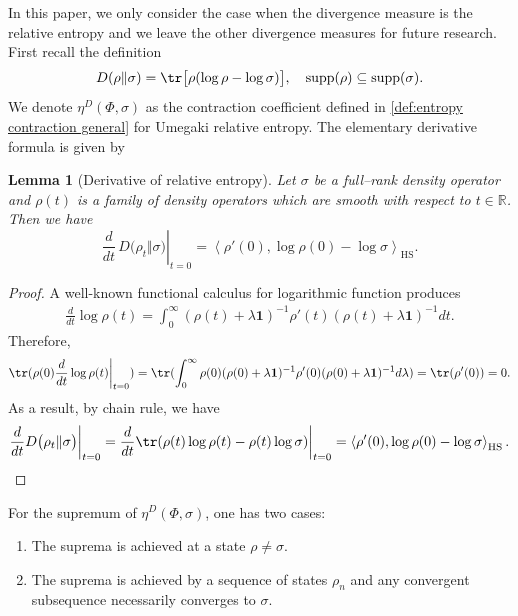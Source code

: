 \documentclass[11pt,reqno]{amsart}
\numberwithin{equation}{section}
\newtheorem{lemma}{Lemma}[section]
\newcommand{\mb}{\mathbb}
\newcommand{\RelEnt}{D}
\newcommand{\HS}[2]{\left\langle #1,#2\right\rangle_{\mathrm{HS}}} %
\begin{document}
In this paper, we only consider the case when the divergence measure is the relative entropy and we leave the other divergence measures for future research. First recall the definition
\begin{equation}
      \RelEnt(\rho\Vert\sigma)
 =\tr \bigl[\rho(\log\rho-\log\sigma)\bigr],
  \quad \mathrm{supp}(\rho) \subseteq \mathrm{supp}(\sigma).
\end{equation}
We denote $\eta^D(\Phi,\sigma)$ as the contraction coefficient defined in \eqref{def:entropy contraction general} for Umegaki relative entropy. The elementary derivative formula is given by 
\begin{lemma}[Derivative of relative entropy]
\label{lem:derivative relative entropy}
Let $\sigma$ be a full–rank density operator
and $\rho(t)$ is a family of density operators which are smooth with respect to $t \in \mb R$. Then we have
\begin{equation}
    \left.\frac{d}{dt}\,D\bigl(\rho_t\Vert\sigma\bigr)\right|_{t=0}
 = \HS{\rho'(0)}{\log\rho(0) - \log \sigma}.
\end{equation}
\end{lemma}
\begin{proof}
    A well-known functional calculus for logarithmic function produces
    \begin{align*}
        \frac{d}{dt} \log \rho(t) = \int_0^\infty (\rho(t) + \lambda \textbf{1})^{-1} \rho'(t) (\rho(t) + \lambda \textbf{1})^{-1} dt.
    \end{align*}
    Therefore, 
    \begin{align*}
        \tr( \rho(0) \frac{d}{dt} \log \rho(t)\bigg|_{t = 0}) = \tr(\int_0^\infty \rho(0)(\rho(0) + \lambda \textbf{1})^{-1} \rho'(0) (\rho(0) + \lambda \textbf{1})^{-1} d\lambda) = \tr(\rho'(0)) = 0.
    \end{align*}
    As a result, by chain rule, we have 
    \begin{align*}
    \frac{d}{dt} D\bigl(\rho_t\Vert\sigma\bigr)\bigg|_{t=0} = \frac{d}{dt} \tr(\rho(t)\log \rho(t) - \rho(t)\log \sigma) \bigg|_{t=0} = \HS{\rho'(0)}{\log\rho(0) - \log \sigma}.
    \end{align*}
\end{proof}
For the supremum of $\eta^D(\Phi,\sigma)$, one has two cases:
\begin{enumerate}
    \item The suprema is achieved at a state $\rho \neq \sigma$.
    \item The suprema is achieved by a sequence of states $\rho_n$ and any convergent subsequence necessarily converges to $\sigma$. 
\end{enumerate}
\end{document}
